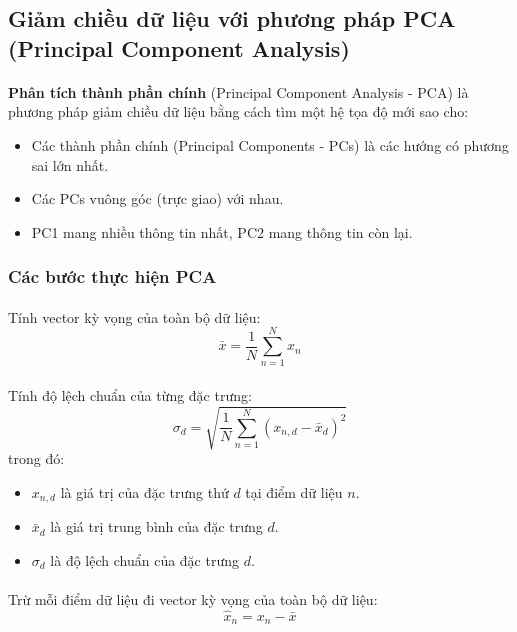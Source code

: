 \subsection{Giảm chiều dữ liệu với phương pháp PCA (Principal Component Analysis)}
\paragraph{}{\textbf{Phân tích thành phần chính} (Principal Component Analysis - PCA) \cite{mlcoban-pca} là phương pháp giảm chiều dữ liệu bằng cách tìm một hệ tọa độ mới sao cho:}

\begin{itemize}
    \item Các thành phần chính (Principal Components - PCs) là các hướng có phương sai lớn nhất.
    \item Các PCs vuông góc (trực giao) với nhau.
    \item  PC1 mang nhiều thông tin nhất, PC2 mang thông tin còn lại.
\end{itemize}

\subsubsection{Các bước thực hiện PCA}
\label{label: pca}

\paragraph{}{Tính vector kỳ vọng của toàn bộ dữ liệu:}
\[
\bar{x} = \frac{1}{N} \sum_{n=1}^{N} x_n
\]
\paragraph{}{Tính độ lệch chuẩn của từng đặc trưng:}
    \[
    \sigma_d = \sqrt{\frac{1}{N} \sum_{n=1}^{N} (x_{n,d} - \bar{x}_d)^2}
    \]
    trong đó:
    \begin{itemize}
        \item \( x_{n,d} \) là giá trị của đặc trưng thứ \( d \) tại điểm dữ liệu \( n \).
        \item \( \bar{x}_d \) là giá trị trung bình của đặc trưng \( d \).
        \item \( \sigma_d \) là độ lệch chuẩn của đặc trưng \( d \).
    \end{itemize}

\paragraph{}{Trừ mỗi điểm dữ liệu đi vector kỳ vọng của toàn bộ dữ liệu:}
\[
\hat{x}_n = x_n - \bar{x}
\]
